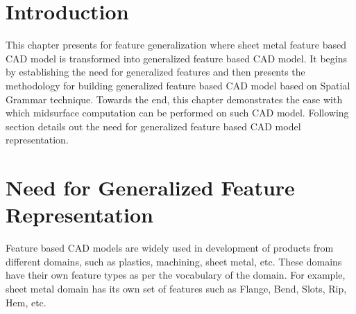 	

\section{Introduction}

This chapter presents  for feature generalization where sheet metal feature based CAD model is transformed into generalized feature based CAD model. It begins by establishing the need for generalized features and then presents the methodology for building generalized feature based CAD model based on Spatial Grammar technique.  Towards the end, this chapter demonstrates the ease with which midsurface computation can be performed on such CAD model.
Following section details out the need for generalized feature based CAD model representation.

\section{Need for Generalized Feature Representation}

Feature based CAD models are widely used in development of products from different domains, such as plastics, machining, sheet metal, etc. These domains have their own feature types as per the vocabulary of the domain. For example, sheet metal domain has its own set of features such as Flange, Bend, Slots, Rip, Hem, etc. 


